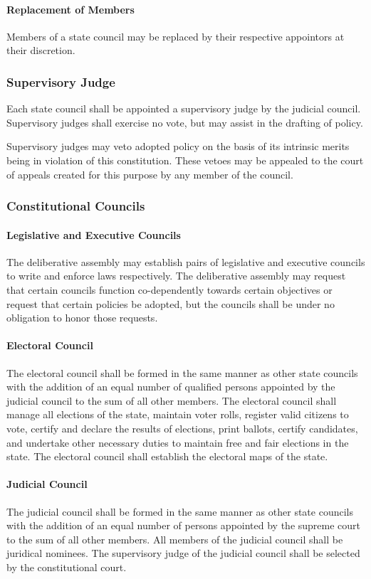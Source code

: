 \documentclass{article}
\begin{document}
\paragraph{Replacement of Members}
Members of a state council may be replaced by their respective appointors at their discretion.
\subsubsection{Supervisory Judge}
Each state council shall be appointed a supervisory judge by the judicial council. Supervisory judges shall exercise no vote, but may assist in the drafting of policy.

Supervisory judges may veto adopted policy on the basis of its intrinsic merits being in violation of this constitution. These vetoes may be appealed to the court of appeals created for this purpose by any member of the council.
\subsubsection{Constitutional Councils}
\paragraph{Legislative and Executive Councils}
The deliberative assembly may establish pairs of legislative and executive councils to write and enforce laws respectively. The deliberative assembly may request that certain councils function co-dependently towards certain objectives or request that certain policies be adopted, but the councils shall be under no obligation to honor those requests.
\paragraph{Electoral Council}
The electoral council shall be formed in the same manner as other state councils with the addition of an equal number of qualified persons appointed by the judicial council to the sum of all other members. The electoral council shall manage all elections of the state, maintain voter rolls, register valid citizens to vote, certify and declare the results of elections, print ballots, certify candidates, and undertake other necessary duties to maintain free and fair elections in the state. The electoral council shall establish the electoral maps of the state.
\paragraph{Judicial Council}
The judicial council shall be formed in the same manner as other state councils with the addition of an equal number of persons appointed by the supreme court to the sum of all other members. All members of the judicial council shall be juridical nominees. The supervisory judge of the judicial council shall be selected by the constitutional court.
\end{document}
